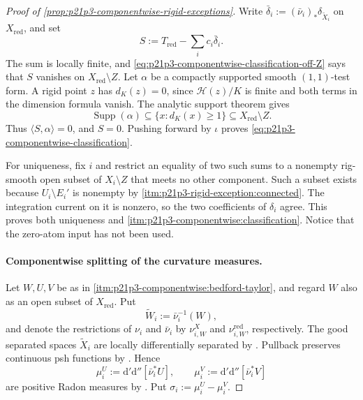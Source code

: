 \begin{proof}[Proof of
\cref{prop:p21p3-componentwise-rigid-exceptions}]
Write
$\bar\delta_i:=(\bar\nu_i)_*\delta_{\widetilde X_i}$ on
$X_{\mathrm{red}}$, and set
\[
                         S:=T_{\mathrm{red}}-\sum_i c_i\bar\delta_i.
\]
The sum is locally finite, and
\eqref{eq:p21p3-componentwise-classification-off-Z} says that $S$ vanishes
on $X_{\mathrm{red}}\setminus Z$.  Let $\alpha$ be a compactly supported
smooth $(1,1)$-test form.  A rigid point $z$ has $d_K(z)=0$, since
$\mathscr H(z)/K$ is finite and both terms in the dimension formula
\cite[(11.2.3.1)]{CLD25} vanish.  The analytic support theorem
\cite[Proposition~15.2.1(a)]{CLD25} gives
\[
 \operatorname{Supp}(\alpha)
    \subseteq\{x:d_K(x)\geq1\}
    \subseteq X_{\mathrm{red}}\setminus Z.
\]
Thus $\langle S,\alpha\rangle=0$, and $S=0$.  Pushing forward by $\iota$
proves \eqref{eq:p21p3-componentwise-classification}.

For uniqueness, fix $i$ and restrict an equality of two such sums to a
nonempty rig-smooth open subset of $X_i\setminus Z$ that meets no other
component.  Such a subset exists because
$U_i\setminus E_i'$ is nonempty by
\cref{itm:p21p3-rigid-exception:connected}.  The integration current on it
is nonzero, so the two coefficients of $\delta_i$ agree.  This proves both
uniqueness and \cref{itm:p21p3-componentwise:classification}.  Notice that
the zero-atom input has not been used.

\paragraph{Componentwise splitting of the curvature measures.}
Let $W,U,V$ be as in
\cref{itm:p21p3-componentwise:bedford-taylor}, and regard $W$ also as an
open subset of $X_{\mathrm{red}}$.  Put
\[
             \widetilde W_i:=\bar\nu_i^{-1}(W),
\]
and denote the restrictions of $\nu_i$ and $\bar\nu_i$ by
$\nu_{i,W}^X$ and $\nu_{i,W}^{\mathrm{red}}$, respectively.  The good
separated spaces $\widetilde X_i$ are locally differentially
separated by \cite[\S15.2.2 and Corollary~15.2.4]{CLD25}.  Pullback preserves
continuous psh functions by
\cite[Proposition~8.1.5]{CLD25}.  Hence
\begin{equation}
 \label{eq:p21p3-componentwise-measures}
 \mu_i^U:=\mathrm d'\mathrm d''[\bar\nu_i^*U],
 \qquad
 \mu_i^V:=\mathrm d'\mathrm d''[\bar\nu_i^*V]
\end{equation}
are positive Radon measures by \cite[Lemma~8.5.5]{CLD25}.  Put
$\sigma_i:=\mu_i^U-\mu_i^V$.


\end{proof}
